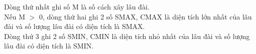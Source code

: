 Dòng thứ nhất ghi số M là số cách xây lâu đài.
\\Nếu M $>$ 0, dòng thứ hai ghi 2 số SMAX, CMAX là diện tích lớn nhất của lâu đài và số lượng lâu đài có diện tích là SMAX.
\\Dòng thứ 3 ghi 2 số SMIN, CMIN là diện tích nhỏ nhất của lâu đài và số lượng lâu đài có diện tích là SMIN.